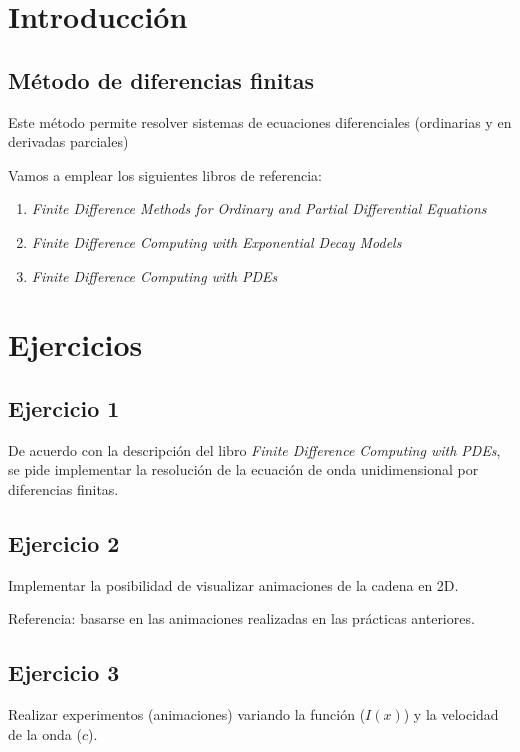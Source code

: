 \documentclass[a4paper]{article}
\begin{document}

\section{Introducción}

\subsection{Método de diferencias finitas}

Este método permite resolver sistemas de ecuaciones diferenciales 
(ordinarias y en derivadas parciales)

\bigskip

Vamos a emplear los siguientes libros de referencia:

\begin{enumerate}
	\item \emph{Finite Difference Methods for Ordinary and Partial 
	Differential Equations}
	\item \emph{Finite Difference Computing with Exponential Decay 
	Models}
	\item \emph{Finite Difference Computing with PDEs}
\end{enumerate}


\section{Ejercicios}

\subsection{Ejercicio 1}

De acuerdo con la descripción del libro \emph{Finite Difference 
Computing with PDEs}, se pide implementar la resolución de la 
ecuación de onda unidimensional por diferencias finitas.

\subsection{Ejercicio 2}
Implementar la posibilidad de visualizar animaciones de la cadena en 2D.

\bigskip

Referencia: basarse en las animaciones realizadas en las prácticas 
anteriores.

\subsection{Ejercicio 3}
Realizar experimentos (animaciones) variando la función ($I(x)$) y la 
velocidad de la onda ($c$).
\end{document}
